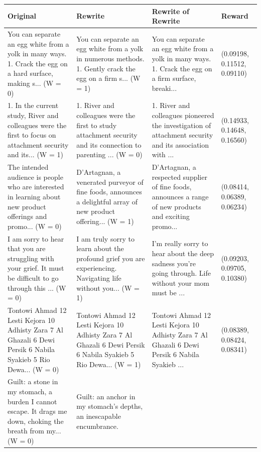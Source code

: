 \documentclass{article}
\begin{document}
\begin{table}[H]
  \centering
  \small
  \begin{tabular}{|p{}|p{}|p{}|p{}|}\hline
  Original & Rewrite & Rewrite of Rewrite & Reward \\ \hline
  You can separate an egg white from a yolk in many ways.
  1. Crack the egg on a hard surface, making s... (W = 0) & You can separate an egg white from a yolk in numerous methods.  
  1. Gently crack the egg on a firm s... (W = 1) & You can separate an egg white from a yolk in many ways.  
  1. Crack the egg on a firm surface, breaki... & (0.09198, 0.11512, 0.09110) \\ \hline
  1. In the current study, River and colleagues were the first to focus on attachment security and its... (W = 1) & 1. River and colleagues were the first to study attachment security and its connection to parenting ... (W = 0) & 1. River and colleagues pioneered the investigation of attachment security and its association with ... & (0.14933, 0.14648, 0.16560) \\ \hline
  The intended audience is people who are interested in learning about new product offerings and promo... (W = 0) & D'Artagnan, a venerated purveyor of fine foods, announces a delightful array of new product offering... (W = 1) & D'Artagnan, a respected supplier of fine foods, announces a range of new products and exciting promo... & (0.08414, 0.06389, 0.06234) \\ \hline
  I am sorry to hear that you are struggling with your grief. It must be difficult to go through this ... (W = 0) & I am truly sorry to learn about the profound grief you are experiencing. Navigating life without you... (W = 1) & I'm really sorry to hear about the deep sadness you're going through. Life without your mom must be ... & (0.09203, 0.09705, 0.10380) \\ \hline
  Tontowi Ahmad 12
  Lesti Kejora 10
  Adhisty Zara 7
  Al Ghazali 6
  Dewi Persik 6
  Nabila Syakieb 5
  Rio Dewa... (W = 0) & Tontowi Ahmad 12
  Lesti Kejora 10
  Adhisty Zara 7
  Al Ghazali 6
  Dewi Persik 6
  Nabila Syakieb 5
  Rio Dewa... (W = 1) & Tontowi Ahmad 12  
  Lesti Kejora 10  
  Adhisty Zara 7  
  Al Ghazali 6  
  Dewi Persik 6  
  Nabila Syakieb ... & (0.08389, 0.08424, 0.08341) \\ \hline
  Guilt: a stone in my stomach,
  a burden I cannot escape.
  It drags me down,
  choking the breath from my... (W = 0) & Guilt: an anchor in my stomach's depths,  
  an inescapable encumbrance.  

\end{tabular}
\end{table}
\end{document}
